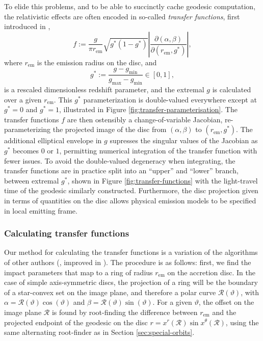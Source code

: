 \documentclass[fleqn,usenatbib]{mnras}
\newcommand{\jacobian}[2]{\left\lvert \frac{\partial #1}{\partial #2} \right\rvert}
\begin{document}
To elide this problems, and to be able to succinctly cache geodesic computation, the relativistic effects are often encoded in so-called \emph{transfer functions}, first introduced in \cite{cunningham_effects_1975},
\begin{equation}
    f:=\frac{g}{\pi r_\text{em}} \sqrt{g^\ast(1 - g^\ast)} \jacobian{(\alpha, \beta)}{(r_\text{em}, g^\ast)},
\end{equation}
where $r_\text{em}$ is the emission radius on the disc, and
\begin{equation}
    g^\ast := \frac{g - g_\text{min}}{g_\text{max} - g_\text{min}} \in [0, 1],
\end{equation}
is a rescaled dimensionless redshift parameter, and the extremal $g$ is calculated over a given $r_\text{em}$. This $g^\ast$ parameterization is double-valued everywhere except at $g^\ast = 0$ and $g^\ast = 1$, illustrated in Figure \ref{fig:transfer-parameterisation}. The transfer functions $f$ are then ostensibly a change-of-variable Jacobian, re-parameterizing the projected image of the disc from $(\alpha, \beta)$ to $(r_\text{em}, g^\ast)$. The additional elliptical envelope in $g$ supresses the singular values of the Jacobian as $g^\ast$ becomes $0$ or $1$, permitting numerical integration of the transfer function with fewer issues. To avoid the double-valued degeneracy when integrating, the transfer functions are in practice split into an ``upper'' and ``lower'' branch, between extremal $g^\ast$, shown in Figure \ref{fig:transfer-functions} with the light-travel time of the geodesic similarly constructed. Furthermore, the disc projection given in terms of quantities on the disc allows physical emission models to be specified in local emitting frame.

\subsubsection{Calculating transfer functions}

Our method for calculating the transfer functions is a variation of the algorithms of other authors (\citealp{speith_photon_1995,bambi_testing_2017}, improved in \citealp{abdikamalov_public_2019}). The procedure is as follows: first, we find the impact parameters that map to a ring of radius $r_\text{em}$ on the accretion disc. In the case of simple axis-symmetric discs, the projection of a ring will be the boundary of a star-convex set on the image plane, and therefore a polar curve $\mathcal{R}(\vartheta)$, with $\alpha = \mathcal{R}(\vartheta) \cos(\vartheta)$ and $\beta = \mathcal{R}(\vartheta) \sin(\vartheta)$. For a given $\vartheta$, the offset on the image plane $\mathcal{R}$ is found by root-finding the difference between $r_\text{em}$ and the projected endpoint of the geodesic on the disc $r = x^r (\mathcal{R}) \sin x^\theta(\mathcal{R})$, using the same alternating root-finder as in Section \ref{sec:special-orbits}.
\end{document}
